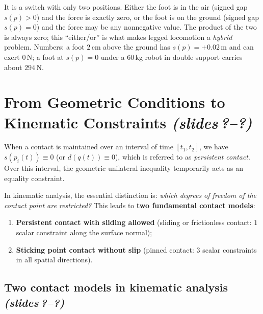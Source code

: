 \documentclass[11pt,a4paper]{article}
\newcommand{\sr}{\emph{(slides\,?--?)}}
\begin{document}
\begin{intuition}
It is a switch with only two positions. Either the foot is in the air (signed gap $s(p)>0$) and the
force is exactly zero, or the foot is on the ground (signed gap $s(p)=0$) and the force may be any
nonnegative value. The product of the two is always zero; this ``either/or'' is what makes
legged locomotion a \emph{hybrid} problem. Numbers: a foot $2$\,cm above the ground has
$s(p)=+0.02$\,m and can exert $0$\,N; a foot at $s(p)=0$ under a $60$\,kg robot in double support
carries about $294$\,N.
\end{intuition}

\section{From Geometric Conditions to Kinematic Constraints \sr}

When a contact is maintained over an interval of time $[t_1, t_2]$, we have $s(p_i(t)) \equiv 0$ (or $d(q(t)) \equiv 0$), which is referred to as \emph{persistent contact}. Over this interval, the geometric unilateral inequality temporarily acts as an equality constraint.

In kinematic analysis, the essential distinction is: \emph{which degrees of freedom of the contact point are restricted?} This leads to \textbf{two fundamental contact models}:
\begin{enumerate}[nosep]
  \item \textbf{Persistent contact with sliding allowed} (sliding or frictionless contact: $1$ scalar constraint along the surface normal);
  \item \textbf{Sticking point contact without slip} (pinned contact: $3$ scalar constraints in all spatial directions).
\end{enumerate}

\subsection{Two contact models in kinematic analysis \sr}
\end{document}
